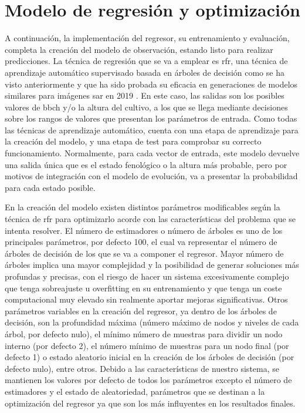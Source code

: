 \section{Modelo de regresión y optimización}
\par A continuación, la implementación del regresor, su entrenamiento y evaluación, completa la creación del modelo de observación, estando listo para realizar predicciones. La técnica de regresión que se va a emplear es \gls{rfr}, una técnica de aprendizaje automático supervisado basada en árboles de decisión como se ha visto anteriormente y que ha sido probada su eficacia en generaciones de modelos similares para imágenes \gls{sar} en 2019 \cite{artRF}. En este caso, las salidas son los posibles valores de \gls{bbch} y/o la altura del cultivo, a los que se llega mediante decisiones sobre los rangos de valores que presentan los parámetros de entrada. Como todas las técnicas de aprendizaje automático, cuenta con una etapa de aprendizaje para la creación del modelo, y una etapa de test para comprobar su correcto funcionamiento. Normalmente, para cada vector de entrada, este modelo devuelve una salida única que es el estado fenológico o la altura más probable, pero por motivos de integración con el modelo de evolución, va a presentar la probabilidad para cada estado posible. 
\\
\par En la creación del modelo existen distintos parámetros modificables según la técnica de \gls{rfr} para optimizarlo acorde con las características del problema que se intenta resolver. El número de estimadores o número de árboles es uno de los principales parámetros, por defecto 100, el cual va representar el número de árboles de decisión de los que se va a componer el regresor. Mayor número de árboles implica una mayor complejidad y la posibilidad de generar soluciones más profundas y precisas, con el riesgo de hacer un sistema excesivamente complejo que tenga sobreajuste u overfitting en su entrenamiento y que tenga un coste computacional muy elevado sin realmente aportar mejoras significativas. Otros parámetros variables en la creación del regresor, ya dentro de los árboles de decisión, son la profundidad máxima (número máximo de nodos y niveles de cada árbol, por defecto nulo), el mínimo número de muestras para dividir un nodo interno (por defecto 2), el número mínimo de muestras para un nodo final (por defecto 1) o estado aleatorio inicial en la creación de los árboles de decisión (por defecto nulo), entre otros. Debido a las características de nuestro sistema, se mantienen los valores por defecto de todos los parámetros excepto el número de estimadores y el estado de aleatoriedad, parámetros que se destinan a la optimización del regresor ya que son los más influyentes en los resultados finales. 
